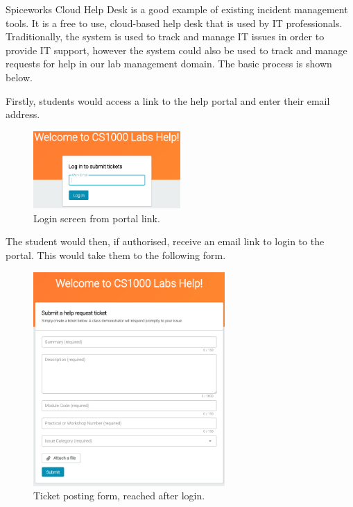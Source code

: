 Spiceworks Cloud Help Desk is a good example of existing incident management tools. It is a free to use, cloud-based help desk that is used by IT professionals. Traditionally, the system is used to track and manage IT issues in order to provide IT support, however the system could also be used to track and manage requests for help in our lab management domain. The basic process is shown below.

Firstly, students would access a link to the help portal and enter their email address.

\FloatBarrier
\begin{figure}[H]
  \centering
  \includegraphics[width=0.5\textwidth]{2context/images/SWportalLogin.png}
  \caption{Login screen from portal link.}
\end{figure}

The student would then, if authorised, receive an email link to login to the portal. This would take them to the following form.

\FloatBarrier
\begin{figure}[H]
  \centering
  \includegraphics[width=0.65\textwidth]{2context/images/SWpostTicket.png}
  \caption{Ticket posting form, reached after login.}
\end{figure}

